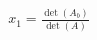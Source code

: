 \documentclass[preview]{standalone}
\begin{document}
\begin{align*}
x_1 = \frac{\det(A_{b})}{\det(A)}
\end{align*}
\end{document}
